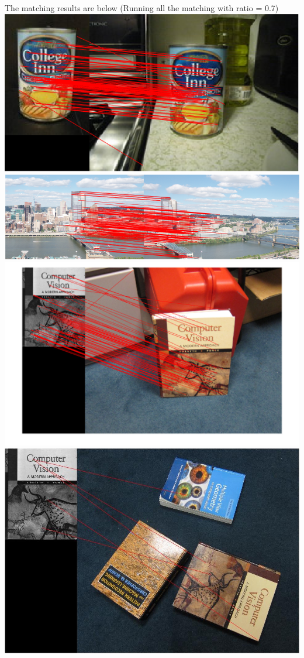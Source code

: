 \documentclass[12pt,letterpaper,boxed]{hmcpset}
\begin{document}
\begin{solution}
  The matching results are below (Running all the matching with ratio = 0.7)\\
  \includegraphics[width=\textwidth]{2_4_chicken.png}\\
  \includegraphics[width=\textwidth]{2_4_incline.png}\\
  \includegraphics[width=\textwidth]{2_4_book.png}\\
  \includegraphics[width=\textwidth]{2_4_book_rot.jpg}\\

\end{solution}
\end{document}
